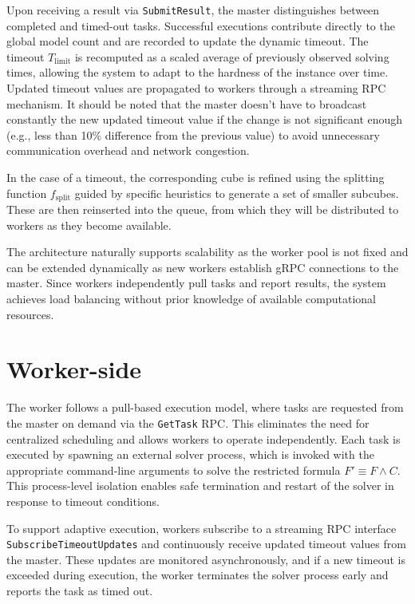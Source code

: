 \documentclass{report}
\begin{document}
Upon receiving a result via \texttt{SubmitResult}, the master distinguishes 
between completed and timed-out tasks. Successful executions contribute directly 
to the global model count and are recorded to update the dynamic timeout. 
The timeout $T_{\text{limit}}$ is recomputed as a scaled average of previously 
observed solving times, allowing the system to adapt to the hardness of the instance over time. 
Updated timeout values are propagated to workers through a streaming RPC mechanism.
It should be noted that the master doesn't have to broadcast constantly the new updated timeout value
if the change is not significant enough (e.g., less than 10\% difference from the previous value) 
to avoid unnecessary communication overhead and network congestion.

In the case of a timeout, the corresponding cube is refined 
using the splitting function $f_{\text{split}}$ guided by specific heuristics to generate a set of smaller subcubes.
These are then reinserted into the queue, from which they will be distributed to workers as they become available.

The architecture naturally supports scalability as the worker pool is not fixed and can be 
extended dynamically as new workers establish gRPC connections to the master. 
Since workers independently pull tasks and report results, 
the system achieves load balancing without prior knowledge of available computational resources.
\vspace{-1.5em}
\section{Worker-side}
\vspace{-1.5em}
The worker follows a pull-based execution model, where tasks are requested from the master on 
demand via the \texttt{GetTask} RPC. This eliminates the need for centralized scheduling and allows workers to operate independently.
Each task is executed by spawning an external solver process, 
which is invoked with the appropriate command-line arguments to solve the restricted formula $F' \equiv F \land C$. 
This process-level isolation enables safe termination and restart of the solver 
in response to timeout conditions. 

To support adaptive execution, workers subscribe to a streaming RPC interface \texttt{SubscribeTimeoutUpdates} and continuously receive 
updated timeout values from the master. These updates are monitored asynchronously, and if a new timeout is exceeded 
during execution, the worker terminates the solver process early and reports the task as timed out.
\end{document}
